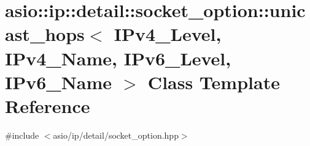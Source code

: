 \hypertarget{classasio_1_1ip_1_1detail_1_1socket__option_1_1unicast__hops}{}\section{asio\+:\+:ip\+:\+:detail\+:\+:socket\+\_\+option\+:\+:unicast\+\_\+hops$<$ I\+Pv4\+\_\+\+Level, I\+Pv4\+\_\+\+Name, I\+Pv6\+\_\+\+Level, I\+Pv6\+\_\+\+Name $>$ Class Template Reference}
\label{classasio_1_1ip_1_1detail_1_1socket__option_1_1unicast__hops}


{\ttfamily \#include $<$asio/ip/detail/socket\+\_\+option.\+hpp$>$}

